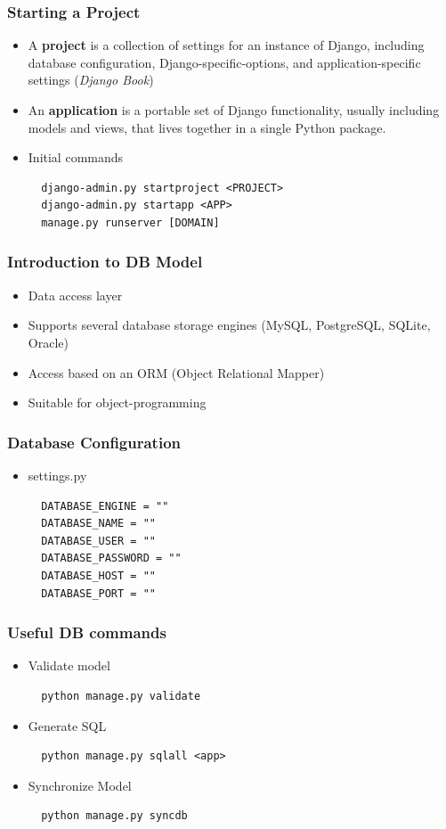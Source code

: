 \begin{frame}[fragile]
\frametitle{Starting a Project}
\begin{itemize}
\item A \textbf{project} is a collection of settings for an instance of Django, including
  database configuration, Django-specific-options, and application-specific
  settings (\textit{Django Book})
\item An \textbf{application} is a portable set of Django functionality, 
   usually including models and views, that lives together in a single 
   Python package.
\item Initial commands
{\scriptsize
\begin{verbatim}
  django-admin.py startproject <PROJECT>
  django-admin.py startapp <APP>
  manage.py runserver [DOMAIN]
\end{verbatim}
}
\end{itemize}
\end{frame}


\begin{frame}
\frametitle{Introduction to DB Model}
\begin{itemize}
\item Data access layer
\item Supports several database storage engines (MySQL, PostgreSQL, SQLite, Oracle)
\item Access based on an ORM (Object Relational Mapper)
\item Suitable for object-programming 
\end{itemize}
\end{frame}


\begin{frame}[fragile]
\frametitle{Database Configuration}
\begin{itemize}
\item settings.py
{\scriptsize
\begin{verbatim}
  DATABASE_ENGINE = ""
  DATABASE_NAME = ""
  DATABASE_USER = ""
  DATABASE_PASSWORD = ""
  DATABASE_HOST = ""
  DATABASE_PORT = ""
\end{verbatim}
}
\end{itemize}
\end{frame}


\begin{frame}[fragile]
\frametitle{Useful DB commands }
\begin{itemize}
\item Validate model
{\scriptsize
\begin{verbatim}
  python manage.py validate
\end{verbatim}
}
\item Generate SQL
{\scriptsize
\begin{verbatim}
  python manage.py sqlall <app>
\end{verbatim}
}
\item Synchronize Model
{\scriptsize
\begin{verbatim}
  python manage.py syncdb
\end{verbatim}
}
\end{itemize}
\end{frame}


